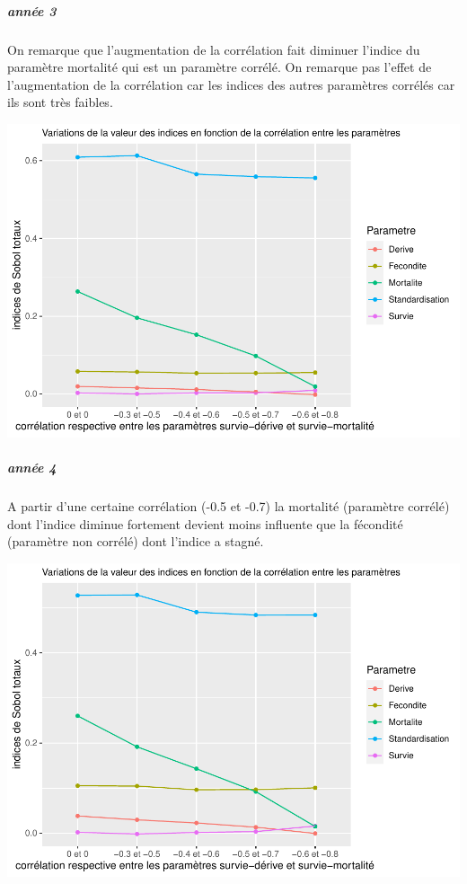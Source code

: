 \documentclass[
]{article}
\begin{document}
\hypertarget{annuxe9e-3-3}{%
\subparagraph{année 3}\label{annuxe9e-3-3}}

On remarque que l'augmentation de la corrélation fait diminuer l'indice
du paramètre mortalité qui est un paramètre corrélé. On remarque pas
l'effet de l'augmentation de la corrélation car les indices des autres
paramètres corrélés car ils sont très faibles.

\includegraphics{rapport_files/figure-latex/prtygsabte-1.pdf}

\hypertarget{annuxe9e-4-3}{%
\subparagraph{année 4}\label{annuxe9e-4-3}}

A partir d'une certaine corrélation (-0.5 et -0.7) la mortalité
(paramètre corrélé) dont l'indice diminue fortement devient moins
influente que la fécondité (paramètre non corrélé) dont l'indice a
stagné.

\includegraphics{rapport_files/figure-latex/prtygasbte-1.pdf}
\end{document}
